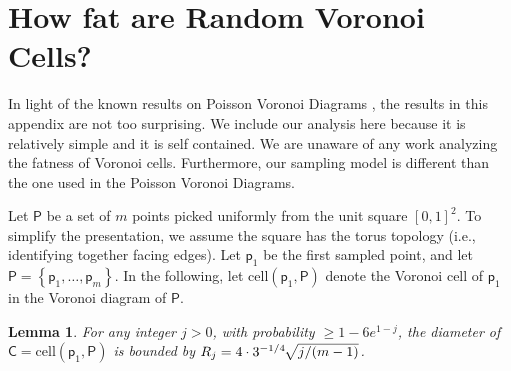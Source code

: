 \documentclass[12pt]{article}
\newcommand{\ts}{\hspace{0.6pt}}\renewcommand{\th}{\si{th}\xspace}
\providecommand{\si}[1]{#1}
\newcommand{\pth}[2][\!]{#1\left({#2}\right)}
\newtheorem{lemma}[theorem]{Lemma}\newtheorem{definition}[theorem]{Definition}
\newcommand{\brc}[1]{\left\{ {#1} \right\}}
\newcommand{\lemlab}[1]{\label{lemma:#1}}
\newcommand{\pnt}{{\mathsf{p}}}\newcommand{\pntA}{{\mathsf{q}}}\newcommand{\pntB}{{\mathsf{s}}}
\newcommand{\PntSet}{\mathsf{P}}\newcommand{\PntSetA}{Q}
\newcommand{\Cell}{\mathsf{C}}
\newcommand{\VorCell}[2]{\mathrm{cell}\pth{#1, #2}}
\newcommand{\mysqrt}[1]{\ts\!\!\sqrt{#1}}
\newcommand{\apndlab}[1]{\label{apnd:#1}}
\begin{document}


\appendix

\section{How fat are Random Voronoi Cells?}
\apndlab{fat:cells}

In light of the known results on Poisson Voronoi Diagrams
\cite{obsc-stcav-00}, the results in this appendix are not too
surprising. We include our analysis here because it is relatively
simple and it is self contained. We are unaware of any work analyzing
the fatness of Voronoi cells. Furthermore, our sampling model is
different than the one used in the Poisson Voronoi Diagrams.

Let $\PntSet$ be a set of $m$ points picked uniformly from the unit
square $[0,1]^2$. To simplify the presentation, we assume the square
has the torus topology (i.e., identifying together facing edges). Let
$\pnt_1$ be the first sampled point, and let $\PntSet = \brc{\pnt_1,
   \ldots, \pnt_m}$. In the following, let $\VorCell{\pnt_1}{\PntSet}$
denote the Voronoi cell of $\pnt_1$ in the Voronoi diagram of
$\PntSet$.

\begin{lemma}
    For any integer $j > 0$, with probability $\geq 1-6 e^{1-j}$, the
    diameter of $\Cell = \VorCell{\pnt_1}{\PntSet}$ is bounded by $R_j
    = 4\cdot 3^{-1/4} \, \mysqrt{j/(m-1)}$.
    
    \lemlab{upper:bound}
\end{lemma}
\end{document}

